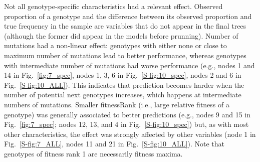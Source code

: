 \documentclass[a4paper,10pt]{article}
\newcommand{\idea}[1]{\textcolor{red}{#1}}
\begin{document}
Not all genotype-specific characteristics had a relevant effect. Observed
proportion of a genotype and the difference between its observed proportion and
true frequency in the sample are variables that do not appear in the final trees
(although the former did appear in the models before prunning). Number of
mutations had a non-linear effect: genotypes with either none or close to
maximum number of mutations lead to better performance, whereas genotypes with
intermediate number of mutations had worse performance (e.g., nodes 1 and 14 in
Fig.~\ref{fig:7_spec}, nodes 1, 3, 6 in Fig.~\ref{S-fig:10_spec}, nodes 2 and 6
in Fig.~\ref{S-fig:10_ALL}). This indicates that prediction becomes harder when
the number of potential next genotypes increases, which happens at intermediate
numbers of mutations.
Smaller fitnessRank
(i.e., large relative fitness of a genotype) was generally associated to
better predictions (e.g., nodes 9 and 15 in Fig.~\ref{fig:7_spec}; nodes
12, 13, and 4 in Fig.~\ref{S-fig:10_spec}) but, as with most other
characteristics, the effect was strongly affected by other variables
(node 1 in Fig.~\ref{S-fig:7_ALL}, nodes 11 and 21 in
Fig.~\ref{S-fig:10_ALL}). Note that genotypes of fitness rank 1 are
necessarily fitness maxima.
\end{document}
